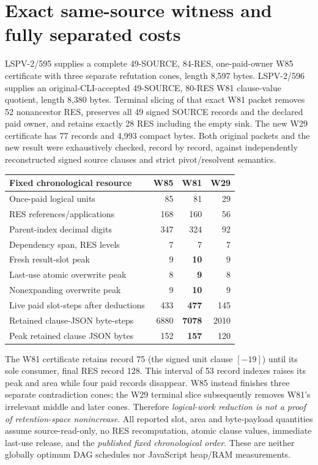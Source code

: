 \documentclass[11pt]{article}
\begin{document}
\section*{Exact same-source witness and fully separated costs}
LSPV-2/595 supplies a complete 49-SOURCE, 84-RES, one-paid-owner W85 certificate with three separate refutation cones, length 8,597 bytes. LSPV-2/596 supplies an original-CLI-accepted 49-SOURCE, 80-RES W81 clause-value quotient, length 8,380 bytes. Terminal slicing of that exact W81 packet removes 52 nonancestor RES, preserves all 49 signed SOURCE records and the declared paid owner, and retains exactly 28 RES including the empty sink. The new W29 certificate has 77 records and 4,993 compact bytes. Both original packets and the new result were exhaustively checked, record by record, against independently reconstructed signed source clauses and strict pivot/resolvent semantics.
\begin{center}
\begin{tabular}{lrrr}
\toprule
Fixed chronological resource & W85 & W81 & W29\\
\midrule
Once-paid logical units & 85 & 81 & 29\\
RES references/applications & 168 & 160 & 56\\
Parent-index decimal digits & 347 & 324 & 92\\
Dependency span, RES levels & 7 & 7 & 7\\
Fresh result-slot peak & 9 & \textbf{10} & 9\\
Last-use atomic overwrite peak & 8 & \textbf{9} & 8\\
Nonexpanding overwrite peak & 9 & \textbf{10} & 9\\
Live paid slot-steps after deductions & 433 & \textbf{477} & 145\\
Retained clause-JSON byte-steps & 6880 & \textbf{7078} & 2010\\
Peak retained clause JSON bytes & 152 & \textbf{157} & 120\\
\bottomrule
\end{tabular}
\end{center}
The W81 certificate retains record 75 (the signed unit clause $[-19]$) until its sole consumer, final RES record 128. This interval of 53 record indexes raises its peak and area while four paid records disappear. W85 instead finishes three separate contradiction cones; the W29 terminal slice subsequently removes W81's irrelevant middle and later cones. Therefore \emph{logical-work reduction is not a proof of retention-space nonincrease}. All reported slot, area and byte-payload quantities assume source-read-only, no RES recomputation, atomic clause values, immediate last-use release, and the \emph{published fixed chronological order}. These are neither globally optimum DAG schedules nor JavaScript heap/RAM measurements.
\end{document}
